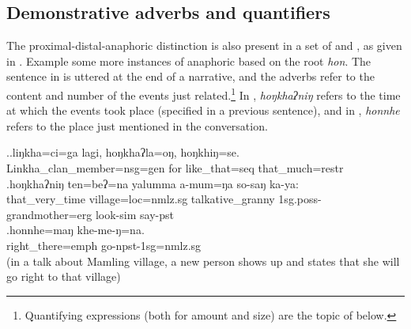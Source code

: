 \subsection{Demonstrative adverbs and quantifiers}\label{dem-set1rel}

The proximal-distal-anaphoric distinction is also present in a set of  and , as given in . Example \Next some more instances of anaphoric  based on the root \emph{hon}. The sentence in \Next[a] is uttered at the end of a narrative, and the adverbs refer to the content and number of the events just related.\footnote{Quantifying expressions (both for amount and size) are the topic of  below.}  In \Next[b], \emph{hoŋkhaʔniŋ} refers to the time at which the events took place (specified in a previous sentence), and in \Next[c], \emph{honnhe} refers to the place just mentioned in the conversation.

\ex.\ag.liŋkha=ci=ga         lagi, hoŋkhaʔla=oŋ,    hoŋkhiŋ=se.\\
Linkha\_clan\_member{\sc =nsg=gen} for like\_that{\sc =seq} that\_much{\sc =restr}\\
 
\bg.hoŋkhaʔniŋ ten=beʔ=na               yalumma          a-mum=ŋa   so-saŋ    ka-ya:\\
that\_very\_time village{\sc =loc=nmlz.sg} talkative\_granny  {\sc 1sg.poss-}grandmother{\sc =erg} look{\sc -sim} say{\sc [3sg]-pst}\\
  
\bg.honnhe=maŋ khe-me-ŋ=na.\\
right\_there{\sc =emph} go{\sc -npst-1sg=nmlz.sg}\\
 (in a talk about Mamling village, a new person shows up and states that she will go right to that village)	
	
